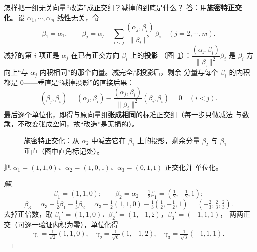 \begin{qa}{怎样把一组无关向量“改造”成正交组？减掉的到底是什么？}
答：用\textbf{施密特正交化}。设 $\alpha_1,\cdots,\alpha_m$ 线性无关，令
\[
  \beta_1=\alpha_1,\qquad
  \beta_j=\alpha_j-\sum_{i<j}\frac{(\alpha_j,\beta_i)}{\|\beta_i\|^2}\,\beta_i
  \quad(j=2,\cdots,m).
\]
减掉的第 $i$ 项正是 $\alpha_j$ 在已有正交方向 $\beta_i$ 上的\textbf{投影}
（图~\ref{fig:schmidt}）：$\dfrac{(\alpha_j,\beta_i)}{\|\beta_i\|^2}\beta_i$
是 $\beta_i$ 方向上“与 $\alpha_j$ 内积相同”的那个向量。减完全部投影后，剩余
分量与每个 $\beta_i$ 的内积都是 $0$——垂直是“减掉投影”的直接后果：
\[
  (\beta_j,\beta_i)
  =(\alpha_j,\beta_i)-\frac{(\alpha_j,\beta_i)}{\|\beta_i\|^2}(\beta_i,\beta_i)=0
  \quad(i<j).
\]
最后逐个单位化，即得与原向量组\textbf{张成相同}的标准正交组（每一步只做减法
与数乘，不改变张成空间，故“改造”是无损的）。
\end{qa}

\begin{figure}[htbp]
\centering
{}
\caption{施密特正交化：从 $\alpha_2$ 中减去它在 $\beta_1$ 上的投影，剩余分量
$\beta_2$ 与 $\beta_1$ 垂直（图中直角标记处）。}
\label{fig:schmidt}
\end{figure}

\begin{example}\label{ex:schmidt}
把 $\alpha_1=(1,1,0)$、$\alpha_2=(1,0,1)$、$\alpha_3=(0,1,1)$ 正交化并
单位化。
\end{example}
\begin{proof}[解]
\[
  \beta_1=(1,1,0);
  \qquad
  \beta_2=\alpha_2-\tfrac12\beta_1=(\tfrac12,-\tfrac12,1);
  \]
  \[
  \beta_3=\alpha_3-\tfrac12\beta_1-\tfrac13\beta_2
         =\alpha_3-\tfrac12(1,1,0)-\tfrac13(\tfrac12,-\tfrac12,1)
         =(-\tfrac23,\tfrac23,\tfrac23).
\]
去掉正倍数，取 $\beta_1'=(1,1,0)$，$\beta_2'=(1,-1,2)$，$\beta_3'=(-1,1,1)$，
两两正交（可逐一验证内积为零），单位化得
\[
  \gamma_1=\tfrac{1}{\sqrt2}(1,1,0),\quad
  \gamma_2=\tfrac{1}{\sqrt6}(1,-1,2),\quad
  \gamma_3=\tfrac{1}{\sqrt3}(-1,1,1).
\]
\end{proof}

